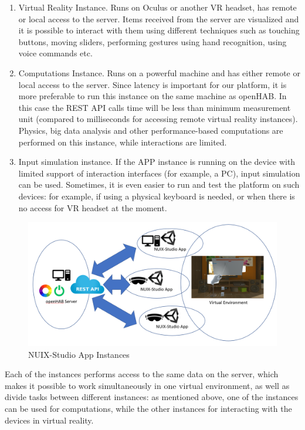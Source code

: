 \begin{enumerate}
    \item Virtual Reality Instance. Runs on Oculus or another VR headset, has remote or local access to the server. Items received from the server are visualized and it is possible to interact with them using different techniques such as touching buttons, moving sliders, performing gestures using hand recognition, using voice commands etc. 
    \item Computations Instance. Runs on a powerful machine and has either remote or local access to the server. Since latency is important for our platform, it is more preferable to run this instance on the same machine as openHAB. In this case the REST API calls time will be less than minimum measurement unit (compared to milliseconds for accessing remote virtual reality instances). Physics, big data analysis and other performance-based computations are performed on this instance, while interactions are limited.
    \item Input simulation instance. If the APP instance is running on the device with limited support of interaction interfaces (for example, a PC), input simulation can be used. Sometimes, it is even easier to run and test the platform on such devices: for example, if using a physical keyboard is needed, or when there is no access for VR headset at the moment.
\end{enumerate}

\begin{figure}
  \centering
  \includegraphics[width=0.9\linewidth]{figures/AppInstances.png}
  \caption{NUIX-Studio App Instances}
  \label{fig:AppInstances-figure}
\end{figure}

Each of the instances performs access to the same data on the server, which makes it possible to work simultaneously in one virtual environment, as well as divide tasks between different instances: as mentioned above, one of the instances can be used for computations, while the other instances for interacting with the devices in virtual reality.

